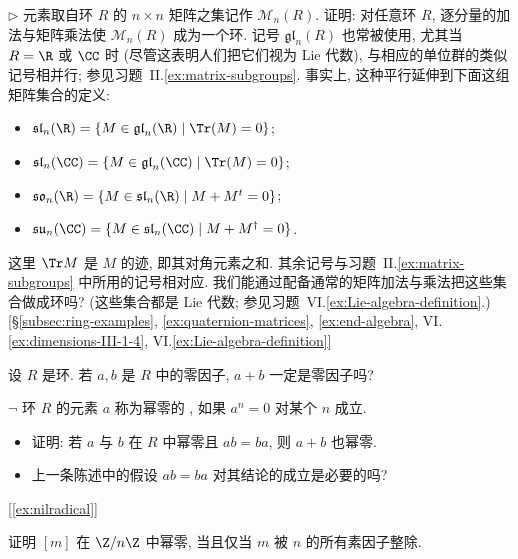 \begin{prob}
\label{ex:matrix-ring-mn}
$\triangleright$ 元素取自环 $R$ 的 $n \times n$ 矩阵之集记作 $\mathcal{M}_n(R)$. 证明: 对任意环 $R$, 逐分量的加法与矩阵乘法使 $\mathcal{M}_n(R)$ 成为一个环. 记号 $\mathfrak{gl}_n(R)$ 也常被使用, 尤其当 $R = \R$ 或 $\CC$ 时 (尽管这表明人们把它们视为 Lie 代数), 与相应的单位群的类似记号相并行; 参见习题~II.\ref{ex:matrix-subgroups}. 事实上, 这种平行延伸到下面这组矩阵集合的定义:
\begin{itemize}
	\item $\mathfrak{sl}_n(\R) = \{M \in \mathfrak{gl}_n(\R) \mid \Tr(M) = 0\}$;
	\item $\mathfrak{sl}_n(\CC) = \{M \in \mathfrak{gl}_n(\CC) \mid \Tr(M) = 0\}$;
	\item $\mathfrak{so}_n(\R) = \{M \in \mathfrak{sl}_n(\R) \mid M + M^t = 0\}$;
	\item $\mathfrak{su}_n(\CC) = \{M \in \mathfrak{sl}_n(\CC) \mid M + M^{\dagger} = 0\}$.
\end{itemize}
这里 $\Tr M$ 是 $M$ 的迹, 即其对角元素之和. 其余记号与习题~II.\ref{ex:matrix-subgroups} 中所用的记号相对应. 我们能通过配备通常的矩阵加法与乘法把这些集合做成环吗? (这些集合都是 Lie 代数; 参见习题~VI.\ref{ex:Lie-algebra-definition}.) [\S\ref{subsec:ring-examples}, \ref{ex:quaternion-matrices}, \ref{ex:end-algebra}, VI.\ref{ex:dimensions-III-1-4}, VI.\ref{ex:Lie-algebra-definition}]
\end{prob}

\begin{prob}
\label{ex:zero-divisor-sum}
设 $R$ 是环. 若 $a, b$ 是 $R$ 中的零因子, $a + b$ 一定是零因子吗?
\end{prob}

\begin{prob}
\label{ex:nilpotent}
$\neg$ 环 $R$ 的元素 $a$ 称为幂零的%
, 如果 $a^n = 0$ 对某个 $n$ 成立.
\begin{itemize}
	\item 证明: 若 $a$ 与 $b$ 在 $R$ 中幂零且 $ab = ba$, 则 $a + b$ 也幂零.
	\item 上一条陈述中的假设 $ab = ba$ 对其结论的成立是必要的吗?
\end{itemize}
[\ref{ex:nilradical}]
\end{prob}

\begin{prob}
\label{ex:nilpotent-zn}
证明 $[m]$ 在 $\Z/n\Z$ 中幂零, 当且仅当 $m$ 被 $n$ 的所有素因子整除.
\end{prob}

